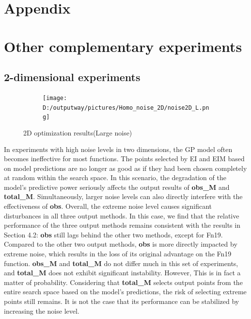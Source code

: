 \documentclass{article}
\begin{document}

\clearpage

{\centering\section*{Appendix}}
\appendix
\section{Other complementary experiments}
\subsection{2-dimensional experiments}
\begin{figure}[H]
    \centering
    \begin{subfigure}[t]{.96\linewidth}
        \centering
        \texttt{[image: D:/outputway/pictures/Homo\_noise\_2D/noise2D\_L.png]}
    \end{subfigure}
    \caption{2D optimization results(Large noise)}
    \label{Fig7}
\end{figure}

\hspace{2em}In experiments with high noise levels in two dimensions, the GP model often becomes ineffective for most functions. The points selected by EI and EIM based on model predictions are no longer as good as if they had been chosen completely at random within the search space. In this scenario, the degradation of the model's predictive power seriously affects the output results of \textbf{obs\_M} and \textbf{total\_M}. Simultaneously, larger noise levels can also directly interfere with the effectiveness of \textbf{obs}. Overall, the extreme noise level causes significant disturbances in all three output methods. In this case, we find that the relative performance of the three output methods remains consistent with the results in Section 4.2: \textbf{obs} still lags behind the other two methods, except for Fn19. Compared to the other two output methods, \textbf{obs} is more directly impacted by extreme noise, which results in the loss of its original advantage on the Fn19 function. \textbf{obs\_M} and \textbf{total\_M} do not differ much in this set of experiments, and \textbf{total\_M} does not exhibit significant instability. However, This is in fact a matter of probability. Considering that \textbf{total\_M} selects output points from the entire search space based on the model's predictions, the risk of selecting extreme points still remains. It is not the case that its performance can be stabilized by increasing the noise level.
\end{document}
